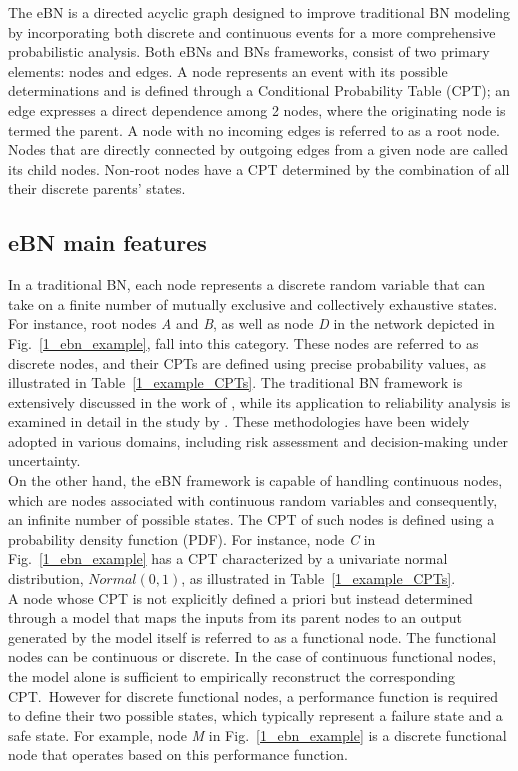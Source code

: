 
The eBN is a directed acyclic graph designed to improve traditional BN modeling by incorporating both discrete and continuous events for a more comprehensive probabilistic analysis.
Both eBNs and BNs frameworks, consist of two primary elements: nodes and edges. A node represents an event with its possible determinations and is defined through a Conditional Probability Table (CPT); an edge expresses a direct dependence among 2 nodes, where the originating node is termed the parent.
A node with no incoming edges is referred to as a root node. Nodes that are directly connected by outgoing edges from a given node are called its child nodes.
Non-root nodes have a CPT determined by the combination of all their discrete parents' states.\\

\subsection{eBN main features}
In a traditional BN, each node represents a discrete random variable that can take on a finite number of mutually exclusive and collectively exhaustive states.
For instance, root nodes \textit{A} and  \textit{B}, as well as node \textit{D} in the network depicted in Fig.~\ref{1_ebn_example}, fall into this category.
These nodes are referred to as discrete nodes, and their CPTs are defined using precise probability values, as illustrated in Table~\ref{1_example_CPTs}.
The traditional BN framework is extensively discussed in the work of \textcite{russell_computer}, while its application to reliability analysis is examined in detail in the study by \textcite{langseth_bayesian_2007}.
These methodologies have been widely adopted in various domains, including risk assessment and decision-making under uncertainty. \\
On the other hand, the eBN framework is capable of handling continuous nodes, which are nodes associated with continuous random variables and consequently, an infinite number of possible states.
The CPT of such nodes is defined using a probability density function (PDF).
For instance, node \textit{C} in Fig.~\ref{1_ebn_example} has a CPT characterized by a univariate normal distribution, $Normal(0,1)$, as illustrated in Table~\ref{1_example_CPTs}. \\  
A node whose CPT is not explicitly defined a priori but instead determined through a model that maps the inputs from its parent nodes to an output generated by the model itself is referred to as a functional node.
The functional nodes can be continuous or discrete. 
In the case of continuous functional nodes, the model alone is sufficient to empirically reconstruct the corresponding CPT.\ 
However for discrete functional nodes, a performance function is required to define their two possible states, which typically represent a failure state and a safe state.
For example, node \textit{M} in Fig.~\ref{1_ebn_example} is a discrete functional node that operates based on this performance function. \\

